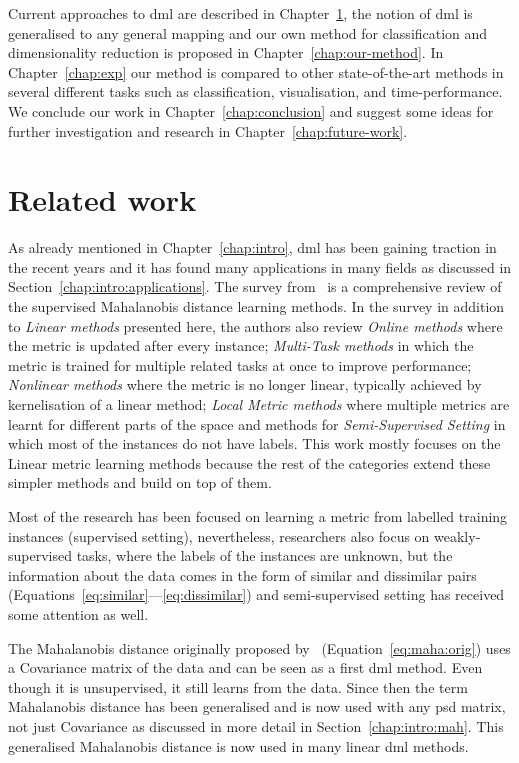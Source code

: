 \documentclass[12pt,a4paper]{report}
\begin{document}
Current approaches to \ac{dml} are described in Chapter~\ref{chap:rw}, the notion of \ac{dml} is generalised to any general mapping and our own method for classification and dimensionality reduction is proposed in Chapter~\ref{chap:our-method}. In Chapter~\ref{chap:exp} our method is compared to other state-of-the-art methods in several different tasks such as classification, visualisation, and time-performance. We conclude our work in Chapter~\ref{chap:conclusion} and suggest some ideas for further investigation and research in Chapter~\ref{chap:future-work}.


\chapter{Related work} \label{chap:rw}

As already mentioned in Chapter~\ref{chap:intro}, \ac{dml} has been gaining traction in the recent years and it has found many applications in many fields as discussed in Section~\ref{chap:intro:applications}. The survey from~\citep{bellet2013survey} is a comprehensive review of the supervised Mahalanobis distance learning methods. In the survey in addition to \textit{Linear methods} presented here, the authors also review \textit{Online methods} where the metric is updated after every instance; \textit{Multi-Task methods} in which the metric is trained for multiple related tasks at once to improve performance; \textit{Nonlinear methods} where the metric is no longer linear, typically achieved by kernelisation of a linear method; \textit{Local Metric methods} where multiple metrics are learnt for different parts of the space and methods for \textit{Semi-Supervised Setting} in which most of the instances do not have labels. This work mostly focuses on the Linear metric learning methods because the rest of the categories extend these simpler methods and build on top of them.

Most of the research has been focused on learning a metric from labelled training instances (supervised setting), nevertheless, researchers also focus on weakly-supervised tasks, where the labels of the instances are unknown, but the information about the data comes in the form of similar and dissimilar pairs (Equations~\ref{eq:similar}---\ref{eq:dissimilar}) and semi-supervised setting has received some attention as well.

The Mahalanobis distance originally proposed by~\citep{mahalanobis1936generalized} (Equation~\ref{eq:maha:orig}) uses a Covariance matrix of the data and can be seen as a first \ac{dml} method. Even though it is unsupervised, it still learns from the data. Since then the term Mahalanobis distance has been generalised and is now used with any \ac{psd} matrix, not just Covariance as discussed in more detail in Section~\ref{chap:intro:mah}. This generalised Mahalanobis distance is now used in many linear \ac{dml} methods.
\end{document}
